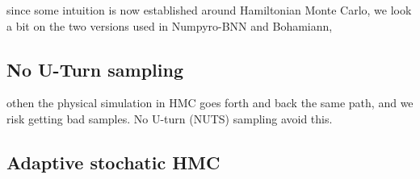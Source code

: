 since some intuition is now established around Hamiltonian Monte Carlo, 
we look a bit on the two versions used in Numpyro-BNN and Bohamiann, 

\subsection{No U-Turn sampling}

othen the physical simulation in HMC goes forth and back the same path, and we risk getting bad samples.
No U-turn (NUTS) sampling avoid this. 

\subsection{Adaptive stochatic HMC}